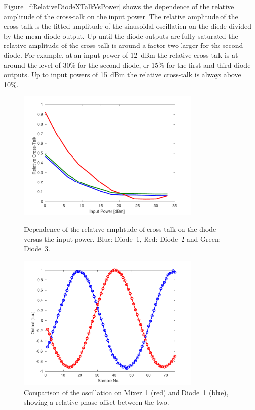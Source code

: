 Figure~\ref{f:RelativeDiodeXTalkVsPower} shows the dependence of the relative amplitude of the cross-talk on the input power. The relative amplitude of the cross-talk is the fitted amplitude of the sinusoidal oscillation on the diode divided by the mean diode output. Up until the diode outputs are fully saturated the relative amplitude of the cross-talk is around a factor two larger for the second diode. For example, at an input power of 12~dBm the relative cross-talk is at around the level of 30\% for the second diode, or 15\% for the first and third diode outputs. Up to input powers of 15~dBm the relative cross-talk is always above 10\%.

\begin{figure}
  \centering
  \includegraphics[width=0.8\textwidth]{Figures/phaseMons/RelativeDiodeXTalkVsPower}
  \caption{Dependence of the relative amplitude of cross-talk on the diode versus the input power. Blue: Diode~1, Red: Diode~2 and Green: Diode~3.}
  \label{f:RelativeDiodeXTalkVsPower}
  \includegraphics[width=0.8\textwidth]{Figures/phaseMons/PhaseDiodeVsMixer}
  \caption{Comparison of the oscillation on Mixer~1 (red) and Diode~1 (blue), showing a relative phase offset between the two.}
  \label{f:PhaseDiodeVsMixer}
\end{figure}

